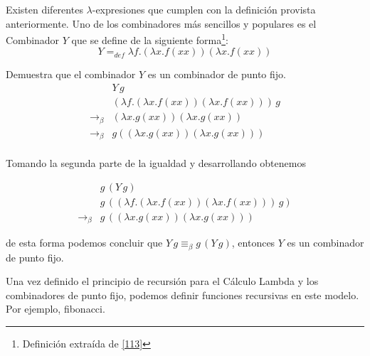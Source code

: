               
                    \begin{definition}[Combinador $Y$] Existen diferentes $\lambda$-expresiones que cumplen con la definición provista anteriormente. Uno de los combinadores más sencillos y populares es el Combinador $Y$ que se define de la siguiente forma\footnote{Definición extraída de \hyperlink{113}{[113]}}:
                        $$Y =_{def} \lambda f.(\lambda x.f(xx))(\lambda x.f(xx))$$
                    \end{definition}
    
                    \begin{exercise} Demuestra que el combinador  $Y$ es un combinador de punto fijo.
                        \[
                            \begin{array}{cl}
                            &Y\,g\\
                            &(\lambda f.(\lambda x.f(xx))(\lambda x.f(xx)))\,g\\
                            \to_\beta&(\lambda x.g(xx))(\lambda x.g(xx))\\
                            \to_\beta&g((\lambda x.g(xx))(\lambda x.g(xx)))\\
                            \end{array}
                        \]
                    
                        Tomando la segunda parte de la igualdad y desarrollando obtenemos
                    
                        \[
                            \begin{array}{cl}
                            &g\,(Y\,g)\\
                            &g\,((\lambda f.(\lambda x.f(xx))(\lambda x.f(xx)))\,g)\\
                            \to_\beta&g\,((\lambda x.g(xx))(\lambda x.g(xx)))
                            \end{array}
                        \]
                    
                        de esta forma podemos concluir que $Y \,g\equiv_\beta g\,(Y\,g)$, entonces $Y$ es un combinador de punto fijo.
                    \end{exercise}

	Una vez definido el principio de recursión para el Cálculo Lambda y los combinadores de punto fijo, podemos definir funciones recursivas en este modelo. Por ejemplo, fibonacci.


